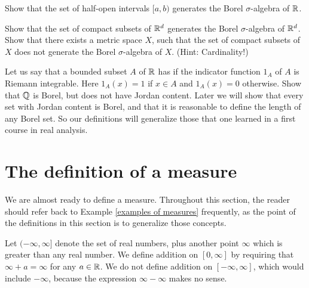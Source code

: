 \begin{exercise}
Show that the set of half-open intervals $[a, b)$ generates the Borel $\sigma$-algebra of $\mathbb{R}$.
\end{exercise}

\begin{exercise}
Show that the set of compact subsets of $\mathbb{R}^d$ generates the Borel $\sigma$-algebra of $\mathbb{R}^d$.
Show that there exists a metric space $X$, such that the set of compact subsets of $X$ does not generate the Borel $\sigma$-algebra of $X$. (Hint: Cardinality!)
\end{exercise}

\begin{exercise}
\label{Jordan content 1}
Let us say that a bounded subset $A$ of $\mathbb{R}$ has  if the indicator function $1_A$ of $A$ is Riemann integrable.
Here $1_A(x) = 1$ if $x \in A$ and $1_A(x) = 0$ otherwise.
Show that $\mathbb{Q}$ is Borel, but does not have Jordan content.
Later we will show that every set with Jordan content is Borel, and that it is reasonable to define the length of any Borel set.
So our definitions will generalize those that one learned in a first course in real analysis.
\end{exercise}


\section{The definition of a measure}
We are almost ready to define a measure.
Throughout this section, the reader should refer back to Example \ref{examples of measures} frequently, as the point of the definitions in this section is to generalize those concepts.

\begin{subsec}
Let $(-\infty, \infty]$ denote the set of real numbers, plus another point $\infty$ which is greater than any real number.
We define addition on $[0, \infty]$ by requiring that $\infty + a = \infty$ for any $a \in \mathbb{R}$.
We do not define addition on $[-\infty, \infty]$, which would include $-\infty$, because the expression $\infty - \infty$ makes no sense.
\end{subsec}


